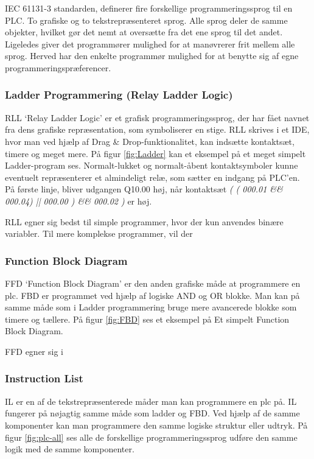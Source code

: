 \noindent IEC 61131-3 standarden, definerer fire forskellige programmeringssprog til en PLC. To grafiske og to tekstrepræsenteret sprog. Alle sprog deler de samme objekter, hvilket gør det nemt at oversætte fra det ene sprog til det andet. Ligeledes giver det programmører mulighed for at manøvrerer frit mellem alle sprog. Herved har den enkelte programmør mulighed for at benytte sig af egne programmeringspræferencer.

\subsubsection{Ladder Programmering (Relay Ladder Logic)}
RLL \enquote*{Relay Ladder Logic} er et grafisk programmeringssprog, der har fået navnet fra dens grafiske repræsentation, som symboliserer en stige. RLL skrives i et IDE, hvor man ved hjælp af Drag \& Drop-funktionalitet, kan indsætte kontaktsæt, timere og meget mere. På figur \ref{fig:Ladder} kan et eksempel på et meget simpelt Ladder-program ses. Normalt-lukket og normalt-åbent kontaktsymboler kunne eventuelt repræsenterer et almindeligt relæ, som sætter en indgang på PLC'en. På første linje, bliver udgangen Q10.00 høj, når kontaktsæt \textit{( ( 000.01 \&\& 000.04) || 000.00 ) \&\& 000.02 )} er høj.


RLL egner sig bedst til simple programmer, hvor der kun anvendes binære variabler. Til mere komplekse programmer, vil der 

\subsubsection{Function Block Diagram}
FFD \enquote*{Function Block Diagram} er den anden grafiske måde at programmere en plc. FBD er programmet ved hjælp af logiske AND og OR blokke. Man kan på samme måde som i Ladder programmering bruge mere avancerede blokke som timere og tællere. På figur \ref{fig:FBD} ses et eksempel på Et simpelt Function Block Diagram.


FFD egner sig i 

\subsubsection{Instruction List}
IL er en af de tekstrepræsenterede måder man kan programmere en plc på. IL fungerer på nøjagtig samme måde som ladder og FBD. Ved hjælp af de samme komponenter kan man programmere den samme logiske struktur eller udtryk. På figur \ref{fig:plc-all} ses alle de forskellige programmeringssprog udføre den samme logik med de samme komponenter.

